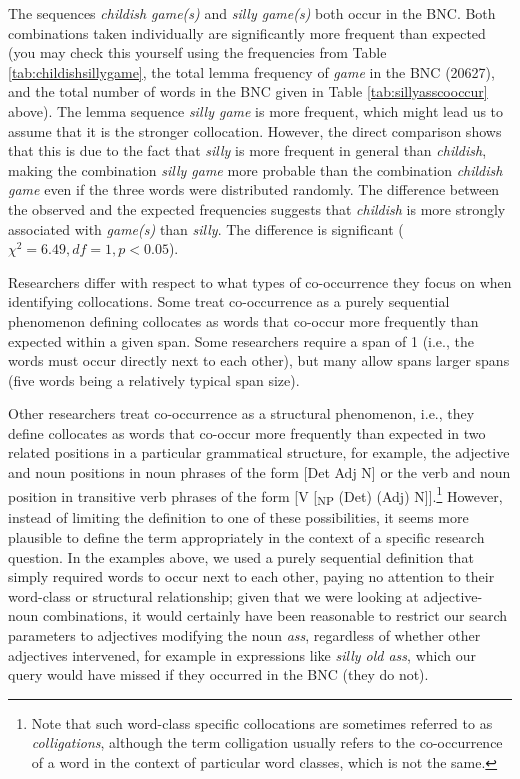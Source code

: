 The sequences \textit{childish game(s)} and \textit{silly game(s)} both occur in the BNC. Both combinations taken individually are significantly more frequent than expected (you may check this yourself using the frequencies from Table \ref{tab:childishsillygame}, the total lemma frequency of \textit{game} in the BNC (\num{20627}), and the total number of words in the BNC given in Table \ref{tab:sillyasscooccur} above). The lemma sequence \textit{silly game} is more frequent, which might lead us to assume that it is the stronger collocation. However, the direct comparison shows that this is due to the fact that \textit{silly} is more frequent in general than \textit{childish}, making the combination \textit{silly game} more probable than the combination \textit{childish game} even if the three words were distributed randomly. The difference between the observed and the expected frequencies suggests that \textit{childish} is more strongly associated with \textit{game(s)} than \textit{silly}. The difference is significant ($\chi^2 = 6.49, df = 1, \textit{p} < 0.05$).

Researchers differ with respect to what types of co-occurrence they focus on when identifying collocations. Some treat co-occurrence as a purely sequential phenomenon defining collocates as words that co-occur more frequently than expected within a given span. Some researchers require a span of 1 (i.e., the words must occur directly next to each other), but many allow spans larger spans (five words being a relatively typical span size).

Other researchers treat co-occurrence as a structural phenomenon, i.e., they define collocates as words that co-occur more frequently than expected in two related positions in a particular grammatical structure, for example, the adjective and noun positions in noun phrases of the form [Det Adj N] or the verb and noun position in transitive verb phrases of the form [V [\textsubscript{NP} (Det) (Adj) N]].\footnote{Note that such word-class specific collocations are sometimes referred to as \textit{colligations}, although the term colligation usually refers to the co-occurrence of a word in the context of particular word classes, which is not the same.} However, instead of limiting the definition to one of these possibilities, it seems more plausible to define the term appropriately in the context of a specific research question. In the examples above, we used a purely sequential definition that simply required words to occur next to each other, paying no attention to their word-class or structural relationship; given that we were looking at adjective-noun combinations, it would certainly have been reasonable to restrict our search parameters to adjectives modifying the noun \textit{ass}, regardless of whether other adjectives intervened, for example in expressions like \textit{silly old ass}, which our query would have missed if they occurred in the BNC (they do not).

